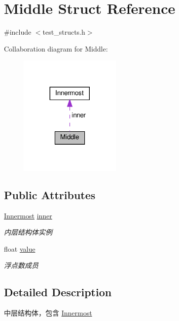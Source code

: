 \hypertarget{structMiddle}{}\section{Middle Struct Reference}
\label{structMiddle}


{\ttfamily \#include $<$test\+\_\+structs.\+h$>$}



Collaboration diagram for Middle\+:\nopagebreak
\begin{figure}[H]
\begin{center}
\leavevmode
\includegraphics[width=140pt]{structMiddle__coll__graph}
\end{center}
\end{figure}
\subsection*{Public Attributes}
\begin{DoxyCompactItemize}
\item 
\hyperlink{structInnermost}{Innermost} \hyperlink{structMiddle_a30f9deb2cdaf831cc66b4a2cae82ac77}{inner}
\begin{DoxyCompactList}\small\item\em 内层结构体实例 \end{DoxyCompactList}\item 
float \hyperlink{structMiddle_a6e2990ab99c9407e3912d19554cd979d}{value}
\begin{DoxyCompactList}\small\item\em 浮点数成员 \end{DoxyCompactList}\end{DoxyCompactItemize}


\subsection{Detailed Description}
中层结构体，包含 \hyperlink{structInnermost}{Innermost} 

